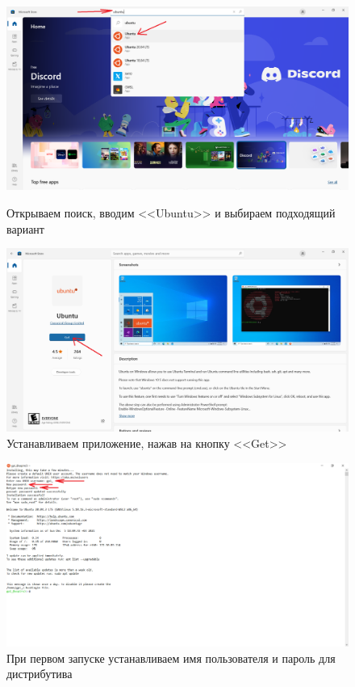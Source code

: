 \begin{figure}[!p]
    \centering
    \begin{minipage}{0.47\textwidth}
        \centering
        \includegraphics[width=\linewidth]
            {_assets/gpi_pz_docker_17.png}
        \caption{Открываем поиск, вводим <<Ubuntu>> и выбираем подходящий вариант}
        \label{fig:gpi_pz_docker_17}
    \end{minipage}
    \begin{minipage}{0.47\textwidth}
        \centering
        \includegraphics[width=\linewidth]
            {_assets/gpi_pz_docker_18.png}
        \caption{Устанавливаем приложение, нажав на кнопку <<Get>>}
        \label{fig:gpi_pz_docker_18}
    \end{minipage}
\end{figure}

\begin{figure}[!p]
    \centering
    \includegraphics[width=12cm]
        {_assets/gpi_pz_docker_19.png}
    \caption{При первом запуске устанавливаем имя пользователя и пароль для дистрибутива}
    \label{fig:gpi_pz_docker_19}
\end{figure}

